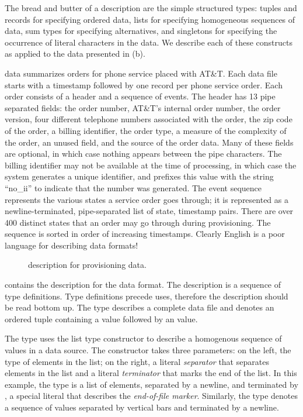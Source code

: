 The bread and butter of a \padsml{} description are the simple
structured types: tuples and records for specifying ordered data,
lists for specifying homogeneous sequences of data, sum types for
specifying alternatives, and singletons for specifying the occurrence
of literal characters in the data.  We describe each of these
constructs as applied to the \dibbler{} data presented in
(b).

\dibbler{} data summarizes orders for phone service placed with AT\&T.
Each \dibbler{} data file starts with a timestamp followed by one
record per phone service order.  Each order consists of a header and a
sequence of events.  The header has 13 pipe separated fields: the
order number, AT\&T's internal order number, the order version, four
different telephone numbers associated with the order, the zip code of
the order, a billing identifier, the order type, a measure of the
complexity of the order, an unused field, and the source of the order
data.  Many of these fields are optional, in which case nothing
appears between the pipe characters.  The billing identifier may not
be available at the time of processing, in which case the system
generates a unique identifier, and prefixes this value with the string
``no\_ii'' to indicate that the number was generated. The event
sequence represents the various states a service order goes through;
it is represented as a newline-terminated, pipe-separated list of
state, timestamp pairs.  There are over 400 distinct states that an
order may go through during provisioning.  The sequence is sorted in
order of increasing timestamps.  Clearly
English is a poor language for describing data formats!

\begin{figure}

  \caption{\padsml{} description for \dibbler{} provisioning data.}
  \label{figure:sirius_pml}
\end{figure}

 contains the \padsml{} description for the
\dibbler{} data format.  The description is a sequence of type
definitions.  Type definitions precede uses, therefore the description
should be read bottom up.
The type  describes a complete \dibbler{} data
file and denotes an ordered tuple containing a
 value followed by an  value.

The type  uses the list type constructor
 to describe a homogenous sequence of values in a data
source.  The  constructor takes three parameters: on the
left, the type of elements in the list; on the right, a literal
\emph{separator} that separates elements in the list and a literal
\emph{terminator} that marks the end of the list.  
In this example, the type  is a list of
 elements, separated by a newline, and terminated by
, a special literal that describes the \emph{end-of-file
  marker}.  Similarly, the  type denotes a
sequence of  values separated by vertical bars and
terminated by a newline.

